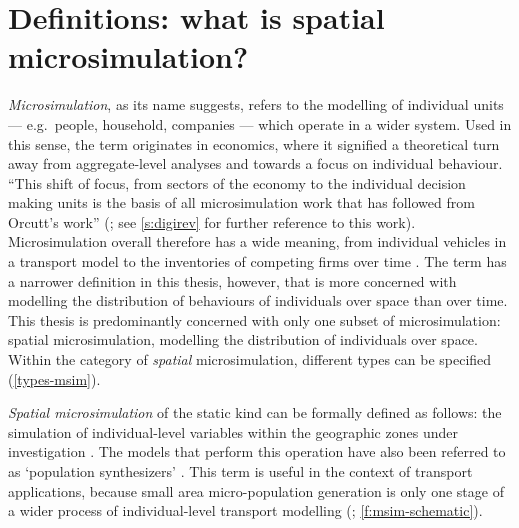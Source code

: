 
\section{Definitions: what is spatial microsimulation?}
\label{s:defs}
\emph{Microsimulation}, as its name suggests, refers to the modelling of
individual units --- e.g.~people, household, companies --- which operate in a
wider system. Used in this sense, the term originates in economics, where it
signified a theoretical turn away from aggregate-level analyses and towards a
focus on individual behaviour. ``This shift of focus, from sectors of the
economy to the individual decision making units is the basis of all
microsimulation work that has followed from Orcutt's work''
(\citealp[p.~145]{Holm1987}; see \cref{s:digirev} for further reference to
this work). Microsimulation overall therefore has a wide meaning, from
individual vehicles in a transport model \citep{Liu2006, Ferguson2012}
to the inventories of
competing firms over time \citep{Bergmann1990a}.
The term has a narrower definition in this
thesis, however, that is more concerned with modelling the distribution of
behaviours of individuals over space than over time. This thesis is predominantly
concerned with only one subset of microsimulation: spatial
microsimulation, modelling the distribution of individuals over
space. Within the category of \emph{spatial} microsimulation, different types
can be specified (\cref{types-msim}).

\emph{Spatial microsimulation} of the static kind can be formally
defined as
follows: the simulation of individual-level variables within the geographic
zones under investigation \citep{ballas2003microsimulation-30-years, Ballas2007simb}.
The models that perform this operation have also
been referred to as `population synthesizers' \citep{Mohammadian2010}. This
term is useful in the context of transport applications, because small area
micro-population generation is only one stage of a wider process of
individual-level transport modelling (\citealp{Pritchard2012}; \cref{f:msim-schematic}).

